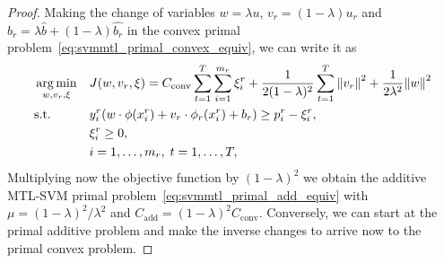 \begin{proof}
    Making the change of variables $w = \lambda u$, $v_r = (1 - \lambda)u_r$ and $b_r = \lambda \hat{b} + (1 - \lambda) \hat{b_r}$ in the convex primal problem~\eqref{eq:svmmtl_primal_convex_equiv}, we can write it as 
        \begin{equation*}
            \begin{aligned}
            & \operatorname*{arg\min}_{w, v_r, \xi}
            & & {J(w, v_r, \xi) = C_\text{conv} \sum_{t= 1}^T \sum_{i=1}^{m_r}{\xi_{i}^r} + \frac{1}{2 (1-\lambda)^2} \sum_{t= 1}^T{\left\lVert v_r\right\rVert^2} + \frac{1}{2 \lambda^2} {\left\lVert w\right\rVert}^2} \\
            & \text{s.t.}
            & & y_{i}^r (w \cdot \phi(x_{i}^r)  + v_r \cdot \phi_r(x_{i}^r) + b_r) \geq p_{i}^r - \xi_{i}^r , \\
            & & & \xi_{i}^r \geq 0,  \\
            & & & i=1,\dotsc,m_r, \;  t= 1,\dotsc,T ,
            \end{aligned}
        \end{equation*}
    Multiplying now the objective function by $(1 - \lambda)^2$ we obtain the additive MTL-SVM primal problem~\eqref{eq:svmmtl_primal_add_equiv} with $\mu =(1 - \lambda)^2 / \lambda^2$ and $C_\text{add} = (1-\lambda)^2 C_\text{conv}$.
    Conversely, we can start at the primal additive problem and make the inverse changes to arrive now to the primal convex problem.
\end{proof}

